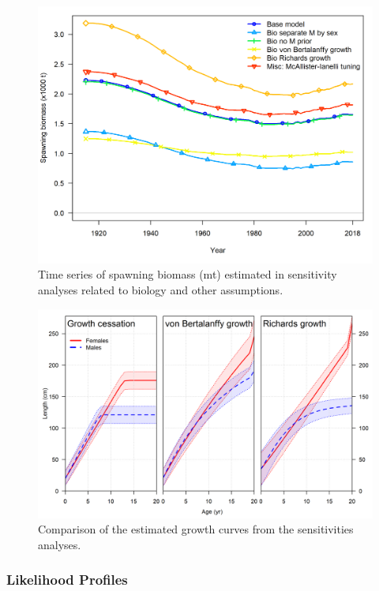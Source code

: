 \documentclass[12pt,]{article}
\begin{document}
\begin{figure}
\centering
\includegraphics{Figures/sens.bio_and_misc_compare1_spawnbio.png}
\caption{Time series of spawning biomass (mt) estimated in sensitivity
analyses related to biology and other assumptions.
\label{fig:Sensitivity_bio_and_misc}}
\end{figure}

\begin{figure}
\centering
\includegraphics{Figures/growth_curve_comparison.png}
\caption{Comparison of the estimated growth curves from the
sensitivities analyses.\label{fig:growth_curve_comparison}}
\end{figure}

\FloatBarrier

\newpage

\hypertarget{likelihood-profiles-1}{%
\subsubsection{Likelihood Profiles}\label{likelihood-profiles-1}}
\end{document}
